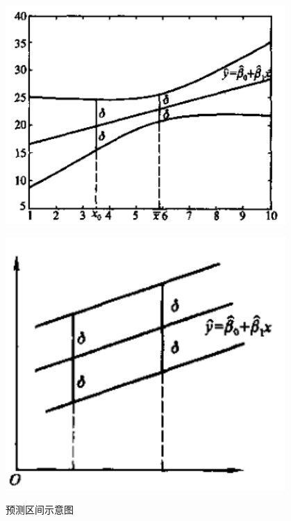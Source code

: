 \begin{figure}[htb!]
    \begin{minipage}[h]{0.47\textwidth}
        \centering
        \includegraphics[width=0.95\textwidth]{figure/8-4-2-1.png}\label{fig:8.4.2.a}
    \end{minipage}
    \begin{minipage}[h]{0.47\textwidth}
        \centering
        \includegraphics[width=0.95\textwidth]{figure/8-4-2-2.png}\label{fig:8.4.2.b}
    \end{minipage}
    \caption{预测区间示意图}\label{fig:8.4.2}
\end{figure}

